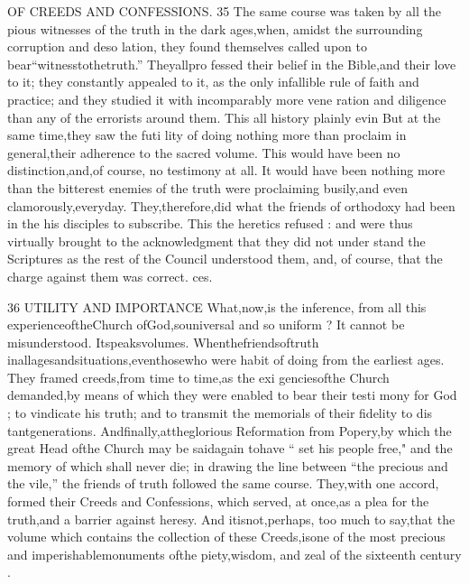 \documentclass[
]{book}
\begin{document}
OF CREEDS AND CONFESSIONS. 35
The same course was taken by all the pious witnesses of the truth in the dark ages,when,
amidst the surrounding corruption and deso
lation, they found themselves called upon to bear``witnesstothetruth.'' Theyallpro
fessed their belief in the Bible,and their love to it; they constantly appealed to it, as the only infallible rule of faith and practice; and they studied it with incomparably more vene ration and diligence than any of the errorists around them. This all history plainly evin
But at the same time,they saw the futi lity of doing nothing more than proclaim in general,their adherence to the sacred volume. This would have been no distinction,and,of course, no testimony at all. It would have been nothing more than the bitterest enemies
of the truth were proclaiming busily,and even clamorously,everyday. They,therefore,did
what the friends of orthodoxy had been in the
his disciples to subscribe. This the heretics
refused : and were thus virtually brought to
the acknowledgment that they did not under stand the Scriptures as the rest of the Council understood them, and, of course, that the charge against them was correct.
ces.

36 UTILITY AND IMPORTANCE
What,now,is the inference, from all this experienceoftheChurch ofGod,souniversal and so uniform ? It cannot be misunderstood.
Itspeaksvolumes. Whenthefriendsoftruth inallagesandsituations,eventhosewho were
habit of doing from the earliest ages. They framed creeds,from time to time,as the exi
genciesofthe Church demanded,by means of which they were enabled to bear their testi mony for God ; to vindicate his truth; and to transmit the memorials of their fidelity to dis tantgenerations. Andfinally,attheglorious Reformation from Popery,by which the great Head ofthe Church may be saidagain tohave
`` set his people free," and the memory of
which shall never die; in drawing the line between ``the precious and the vile,'' the friends of truth followed the same course.
They,with one accord, formed their Creeds
and Confessions, which served, at once,as a
plea for the truth,and a barrier against heresy.
And itisnot,perhaps, too much to say,that the volume which contains the collection of
these Creeds,isone of the most precious and
imperishablemonuments ofthe piety,wisdom, and zeal of the sixteenth century .
\end{document}
